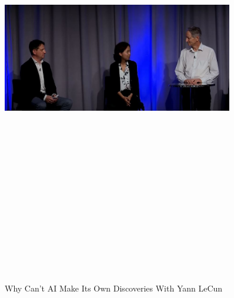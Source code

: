 \documentclass[a4paper,12pt]{article}
\begin{document}
\newpage
\vspace*{1cm} %
\begin{figure}[h]
	\centering
	\vspace{-10pt} %
	\includegraphics[width=0.9\textwidth, height=20cm, keepaspectratio]{../Talks Blogs/Geoffrey Hinton in conversation with Fei-Fei Li Responsible AI development}
	\vspace{-5pt} %
	\caption{Why Can't AI Make Its Own Discoveries With Yann LeCun}
	\vspace{-10pt}
\end{figure}
\end{document}
